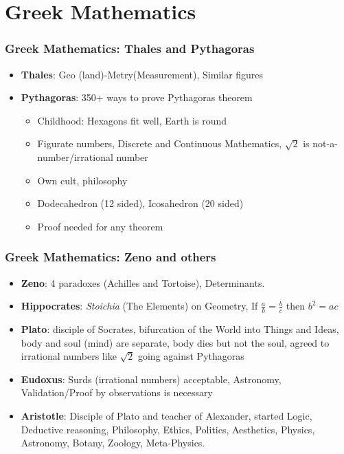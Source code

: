 \section{Greek Mathematics}

\begin{frame}[fragile]
\frametitle{Greek Mathematics: Thales and Pythagoras}
\begin{itemize}
\item \textbf{Thales}: Geo (land)-Metry(Measurement), Similar figures
\item \textbf{Pythagoras}: 350+ ways to prove Pythagoras theorem
	\begin{itemize}
	\item Childhood: Hexagons fit well, Earth is round
	\item Figurate numbers, Discrete and Continuous Mathematics, $\sqrt{2}$ is not-a-number/irrational number
	\item Own cult, philosophy
	\item Dodecahedron (12 sided), Icosahedron (20 sided)
	\item Proof needed for any theorem
	\end{itemize}
\end{itemize}
\end{frame}

\begin{frame}[fragile]
\frametitle{Greek Mathematics: Zeno and others}
\begin{itemize}
\item \textbf{Zeno}: 4 paradoxes (Achilles and Tortoise), Determinants.
\item \textbf{Hippocrates}: \textit{Stoichia} (The Elements) on Geometry, If $\frac{a}{b} = \frac{b}{c}$ then $b^2 = ac$
\item \textbf{Plato}: disciple of Socrates, bifurcation of the World into Things and Ideas, body and soul (mind) are separate, body dies but not the soul, agreed to irrational numbers like $\sqrt{2}$ going against Pythagoras
\item \textbf{Eudoxus}: Surds (irrational numbers) acceptable, Astronomy, Validation/Proof by observations is necessary
\item \textbf{Aristotle}: Disciple of Plato and teacher of Alexander, started Logic, Deductive reasoning, Philosophy, Ethics, Politics, Aesthetics, Physics, Astronomy, Botany, Zoology, Meta-Physics.
\end{itemize}
\end{frame}

